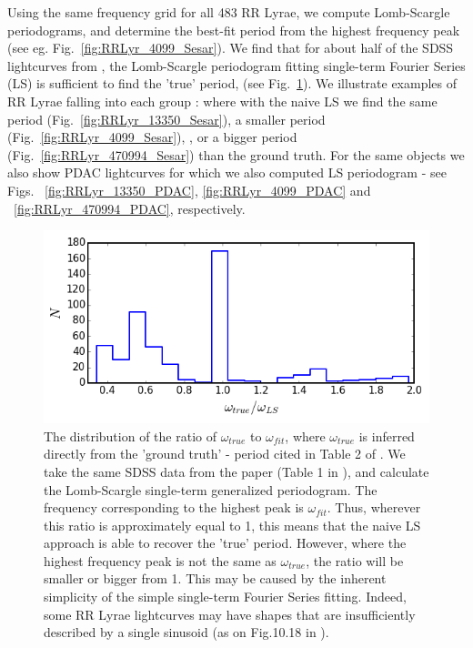 \documentclass[fleqn,usenatbib]{mnras} %
\begin{document}
Using the same frequency grid for all 483 RR Lyrae, we compute Lomb-Scargle periodograms, and determine the best-fit period from the highest frequency peak (see eg. Fig.~\ref{fig:RRLyr_4099_Sesar}).  We find that for about half of the SDSS lightcurves from \cite{sesar2010}, the Lomb-Scargle periodogram fitting single-term Fourier Series (LS) is sufficient to find the 'true' period, (see Fig.~\ref{fig:RRLyr_period_ratios}). We illustrate examples of RR Lyrae falling into each group : where with the naive LS we find the same period (Fig.~\ref{fig:RRLyr_13350_Sesar}), a smaller period (Fig.~\ref{fig:RRLyr_4099_Sesar}), , or a bigger period  (Fig.~\ref{fig:RRLyr_470994_Sesar}) than the ground truth. For the same objects we also show PDAC lightcurves for which we also computed LS periodogram  -  see Figs. ~\ref{fig:RRLyr_13350_PDAC}, \ref{fig:RRLyr_4099_PDAC} and ~\ref{fig:RRLyr_470994_PDAC}, respectively. 


\begin{figure}
\includegraphics[width=\columnwidth]{figs/Fig_3_RRLyr_omega_ratio}
\caption{The distribution of the ratio of $\omega_{true}$ to $\omega_{fit}$, where $\omega_{true}$ is inferred directly from the 'ground truth' - period cited in Table 2 of \citep{sesar2010}. We take the same SDSS data from the paper (Table 1 in \citep{sesar2010}), and calculate the Lomb-Scargle single-term generalized periodogram. The frequency corresponding to the highest peak is  $\omega_{fit}$. Thus, wherever  this ratio is approximately equal to 1, this means that the naive  LS approach is able to recover the 'true' period.  However,  where the highest  frequency peak is not the same as $\omega_{true}$, the ratio will be smaller or bigger from 1. This may be caused by the inherent simplicity of the simple single-term Fourier Series fitting. Indeed, some RR Lyrae lightcurves may have shapes that are insufficiently described by a single sinusoid (as on Fig.10.18  in \citep{ivezic2014}). }
\label{fig:RRLyr_period_ratios}
\end{figure}
\end{document}
